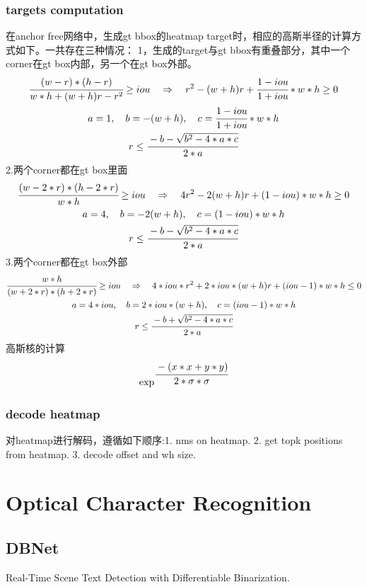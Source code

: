 \documentclass{article}
\begin{document}
\subsubsection{targets computation}
在anchor free网络中，生成gt bbox的heatmap target时，相应的高斯半径的计算方式如下。一共存在三种情况：
1，生成的target与gt bbox有重叠部分，其中一个corner在gt box内部，另一个在gt box外部。
\begin{gather}
        \cfrac{(w-r)*(h-r)}{w*h+(w+h)r-r^2} \ge {iou} \quad\Rightarrow\quad
        {r^2-(w+h)r+\cfrac{1-iou}{1+iou}*w*h} \ge 0 \\
        {a} = 1,\quad{b} = {-(w+h)},\quad{c} = {\cfrac{1-iou}{1+iou}*w*h} \\
        {r} \le \cfrac{-b-\sqrt{b^2-4*a*c}}{2*a}
\end{gather}
2.两个corner都在gt box里面
\begin{gather}
\cfrac{(w-2*r)*(h-2*r)}{w*h} \ge {iou} \quad\Rightarrow\quad
        {4r^2-2(w+h)r+(1-iou)*w*h} \ge 0 \\
        {a} = 4,\quad {b} = {-2(w+h)},\quad {c} = {(1-iou)*w*h} \\
        {r} \le \cfrac{-b-\sqrt{b^2-4*a*c}}{2*a}
\end{gather}
3.两个corner都在gt box外部
\begin{gather}
\cfrac{w*h}{(w+2*r)*(h+2*r)} \ge {iou} \quad\Rightarrow\quad
        {4*iou*r^2+2*iou*(w+h)r+(iou-1)*w*h} \le 0 \\
        {a} = {4*iou},\quad {b} = {2*iou*(w+h)},\quad {c} = {(iou-1)*w*h} \\
        {r} \le \cfrac{-b+\sqrt{b^2-4*a*c}}{2*a}
\end{gather}
高斯核的计算
\begin{align}
\exp^{\cfrac{-(x*x+y*y)}{2*\sigma*\sigma}}
\end{align}

\subsubsection{decode heatmap}
对heatmap进行解码，遵循如下顺序:1. nms on heatmap. 2. get topk positions from heatmap. 3. decode offset and wh size.

\section{Optical Character Recognition}
\subsection{DBNet}
Real-Time Scene Text Detection with Differentiable Binarization\cite{liao2020real}.
\end{document}
